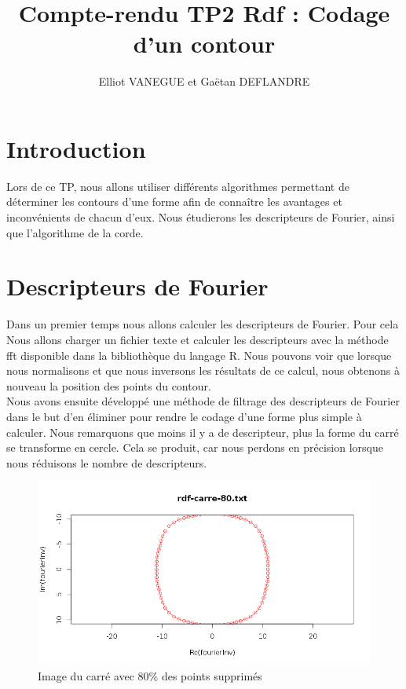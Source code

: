 \documentclass[11pt]{article}
\title{Compte-rendu TP2 Rdf : Codage d'un contour}
\author{Elliot VANEGUE et Gaëtan DEFLANDRE}
\begin{document}


  \maketitle
  
  \mbox{}
  \newpage
  \clearpage
  
  \section{Introduction}
  Lors de ce TP, nous allons utiliser différents algorithmes permettant de déterminer
  les contours d'une forme afin de connaître les avantages et inconvénients de chacun
  d'eux. Nous étudierons les descripteurs de Fourier, ainsi que l'algorithme
  de la corde.
  
  \section{Descripteurs de Fourier}
  Dans un premier temps nous allons calculer les descripteurs de Fourier. Pour cela
  Nous allons charger un fichier texte et calculer les descripteurs avec la méthode
  fft disponible dans la bibliothèque du langage R. Nous pouvons voir que lorsque
  nous normalisons et que nous inversons les résultats de ce calcul, nous obtenons
  à nouveau la position des points du contour.\\ 
  
  Nous avons ensuite développé une méthode de filtrage des descripteurs de Fourier dans le
  but d'en éliminer pour rendre le codage d'une forme plus simple à calculer.
  Nous remarquons que moins il y a de descripteur, plus la forme du carré se transforme en cercle.
  Cela se produit, car nous perdons en précision lorsque nous réduisons le nombre de descripteurs.
  
  \begin{figure}[!h]
    \includegraphics[width=15cm]{../resultat/carre-fourier-20.png}
    \caption{Image du carré avec 80\% des points supprimés}
  \end{figure}
  
\end{document}
